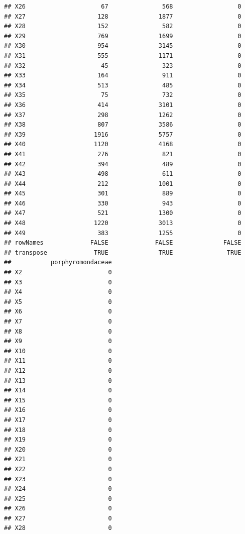 \documentclass[12pt]{beamer}\usepackage[]{graphicx}\usepackage[]{color}
\makeatletter
\newenvironment{kframe}{%
 \def\at@end@of@kframe{}%
 \ifinner\ifhmode%
  \def\at@end@of@kframe{\end{minipage}}%
  \begin{minipage}{\columnwidth}%
 \fi\fi%
 \def\FrameCommand##1{\hskip\@totalleftmargin \hskip-\fboxsep
 \colorbox{shadecolor}{##1}\hskip-\fboxsep
     \hskip-\linewidth \hskip-\@totalleftmargin \hskip\columnwidth}%
 \MakeFramed {\advance\hsize-\width
   \@totalleftmargin\z@ \linewidth\hsize
   \@setminipage}}%
 {\par\unskip\endMakeFramed%
 \at@end@of@kframe}
\newenvironment{knitrout}{}{} %
\makeatother
\begin{document}
\begin{frame}[fragile]
\begin{knitrout}
\begin{kframe}
\begin{verbatim}
## X26                     67               568                  0
## X27                    128              1877                  0
## X28                    152               582                  0
## X29                    769              1699                  0
## X30                    954              3145                  0
## X31                    555              1171                  0
## X32                     45               323                  0
## X33                    164               911                  0
## X34                    513               485                  0
## X35                     75               732                  0
## X36                    414              3101                  0
## X37                    298              1262                  0
## X38                    807              3586                  0
## X39                   1916              5757                  0
## X40                   1120              4168                  0
## X41                    276               821                  0
## X42                    394               489                  0
## X43                    498               611                  0
## X44                    212              1001                  0
## X45                    301               889                  0
## X46                    330               943                  0
## X47                    521              1300                  0
## X48                   1220              3013                  0
## X49                    383              1255                  0
## rowNames             FALSE             FALSE              FALSE
## transpose             TRUE              TRUE               TRUE
##           porphyromondaceae
## X2                        0
## X3                        0
## X4                        0
## X5                        0
## X6                        0
## X7                        0
## X8                        0
## X9                        0
## X10                       0
## X11                       0
## X12                       0
## X13                       0
## X14                       0
## X15                       0
## X16                       0
## X17                       0
## X18                       0
## X19                       0
## X20                       0
## X21                       0
## X22                       0
## X23                       0
## X24                       0
## X25                       0
## X26                       0
## X27                       0
## X28                       0

\end{verbatim}
\end{kframe}
\end{knitrout}
\end{frame}
\end{document}
